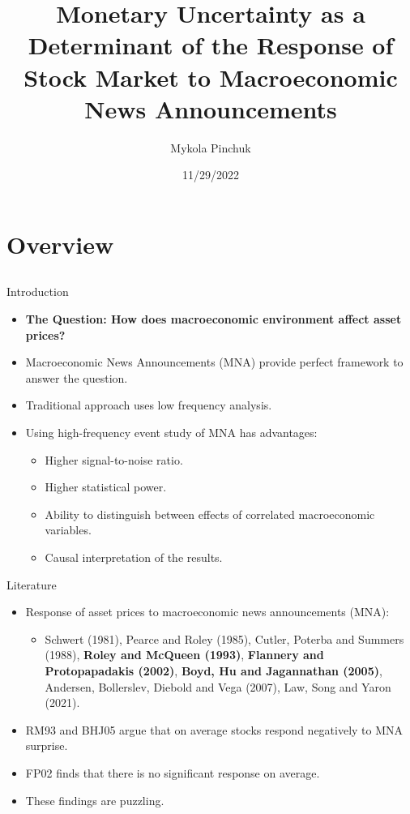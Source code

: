 \documentclass{beamer}
\title[Monetary Uncertainty as a Determinant of the Response of Stock Market to MNAs]{Monetary Uncertainty as a Determinant of the Response of Stock Market to Macroeconomic News Announcements\\ }
\author{Mykola Pinchuk}
\date{11/29/2022}
\begin{document}
\begin{frame}
  \titlepage
\end{frame}

\section{Overview}
\subsection{}


\begin{frame}{Introduction}
\begin{itemize}
    \item {\textbf{The Question: How does macroeconomic environment affect asset prices?}}
    \item {Macroeconomic News Announcements (MNA) provide perfect framework to answer the question.}    
    \item {Traditional approach uses low frequency analysis.}    
    \item {Using high-frequency event study of MNA has advantages:}
    \begin{itemize}
        \item {Higher signal-to-noise ratio.}
        \item {Higher statistical power.}
        \item {Ability to distinguish between effects of correlated macroeconomic variables.}
        \item {Causal interpretation of the results.}
    \end{itemize}
\end{itemize}
\end{frame}


\begin{frame}{Literature}
\begin{itemize}
    \item {Response of asset prices to macroeconomic news announcements (MNA):}
    \begin{itemize}
        \item {Schwert (1981), Pearce and Roley (1985), Cutler, Poterba and Summers (1988), \textbf{Roley and McQueen (1993)}, \textbf{Flannery and Protopapadakis (2002)}, \textbf{Boyd, Hu and Jagannathan (2005)}, Andersen, Bollerslev, Diebold and Vega (2007), Law, Song and Yaron (2021).}
    \end{itemize}
    \item {RM93 and BHJ05 argue that on average stocks respond negatively to MNA surprise.}
    \item {FP02 finds that there is no significant response on average.}
    \item {These findings are puzzling.}
\end{itemize}
\end{frame}
\end{document}
